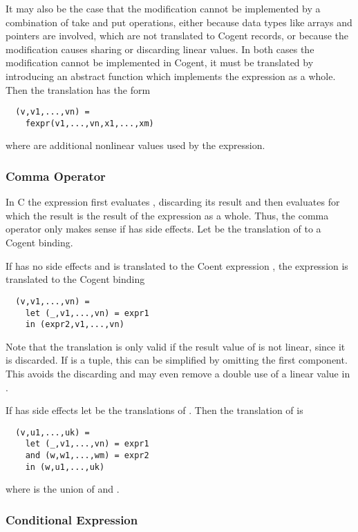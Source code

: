 It may also be the case that the modification cannot be implemented by a combination of take and put operations, either 
because data types like arrays and pointers are involved, which are not translated to Cogent records, or because
the modification causes sharing or discarding linear values. In both cases the modification cannot be implemented in
Cogent, it must be translated by introducing an abstract function  which implements the expression 
as a whole. Then the translation has the form
\begin{verbatim}
  (v,v1,...,vn) = 
    fexpr(v1,...,vn,x1,...,xm)
\end{verbatim}
where  are additional nonlinear values used by the expression.

\subsubsection{Comma Operator}

In C the expression  first evaluates , discarding its result and then evaluates  for which
the result is the result of the expression as a whole. Thus, the comma operator only makes sense if  has side
effects. Let  be the translation of  to a Cogent binding.

If  has no side effects and is translated to the Coent expression , the expression 
is translated to the Cogent binding
\begin{verbatim}
  (v,v1,...,vn) = 
    let (_,v1,...,vn) = expr1
    in (expr2,v1,...,vn) 
\end{verbatim}
Note that the translation is only valid if the result value of  is not linear, since it is discarded. If 
 is a tuple, this can be simplified by omitting the first component. This avoids the discarding and 
may even remove a double use of a linear value in .

If  has side effects let  be the translations of . Then the translation of 
 is 
\begin{verbatim}
  (v,u1,...,uk) = 
    let (_,v1,...,vn) = expr1
    and (w,w1,...,wm) = expr2
    in (w,u1,...,uk) 
\end{verbatim}
where  is the union of  and . 

\subsubsection{Conditional Expression}

